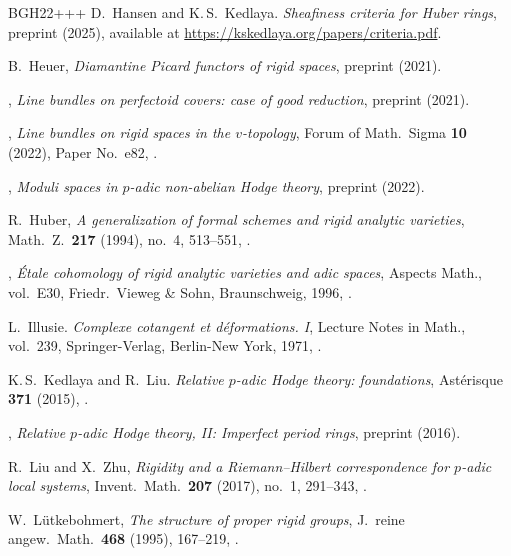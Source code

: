 \documentclass[11pt]{amsart}
\numberwithin{equation}{section}
\theoremstyle{definition}
\theoremstyle{remark}
\begin{document}
\begin{thebibliography}{BGH{\etalchar{+}}22+++}
D.~Hansen and  K.\,S.~Kedlaya.
{\em Sheafiness criteria for {H}uber rings}, preprint (2025), available at \url{https://kskedlaya.org/papers/criteria.pdf}.

B.~Heuer, 
{\em {D}iamantine {P}icard functors of rigid spaces}, preprint  (2021).
	
\bysame, 
{\em Line bundles on perfectoid covers: case of good reduction}, preprint  (2021).
	
\bysame, 
{\em Line bundles on rigid spaces in the $v$-topology}, Forum of Math.\ Sigma \textbf{10} (2022), Paper No.~e82, .
	
\bysame, 
{\em Moduli spaces in $p$-adic non-abelian {H}odge theory}, preprint  (2022).
	
R.~Huber, 
{\em {A} generalization of formal schemes and rigid analytic varieties}, Math.~Z.\ \textbf{217} (1994), no.~4, 513--551, .
	
\bysame, 
{\em \'{E}tale cohomology of rigid analytic varieties and adic spaces}, Aspects Math., vol.~E30, Friedr.\ Vieweg \& Sohn, Braunschweig, 1996, .
	
L.~Illusie.
{\em Complexe cotangent et d\'{e}formations. {I}}, Lecture Notes in Math., vol.~239, Springer-Verlag, Berlin-New York, 1971, .
	
K.\,S.~Kedlaya and  R.~Liu.
{\em {R}elative {$p$}-adic {H}odge theory: foundations}, Ast\'{e}risque \textbf{371} (2015), .

\bysame, 
{\em {R}elative $p$-adic {H}odge theory, {I}{I}: {I}mperfect period rings}, preprint  (2016).

R.~Liu and  X.~Zhu, 
{\em Rigidity and a {R}iemann--{H}ilbert correspondence for {$p$}-adic local systems}, Invent.\ Math.\ \textbf{207} (2017), no.~1, 291--343, .

W.~L{\"{u}}tkebohmert, 
{\em The structure of proper rigid groups}, J.~reine angew.\ Math.\ \textbf{468} (1995), 167--219, .


\end{thebibliography}
\end{document}
